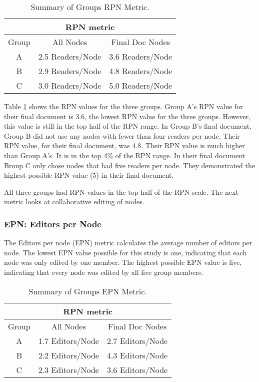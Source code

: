 \small
\begin{table}[htb]
  \caption{Summary of Groups RPN Metric.}
  \begin{center}
    \begin{tabular}{|c|c|c|}
      \hline
      \multicolumn{3}{|c|}{\rule[-3mm]{0mm}{8mm}\bf RPN metric}\\ \hline 
      Group&All Nodes&Final Doc Nodes\\ \hline 
      \hline
      A&2.5 Readers/Node&3.6 Readers/Node\\ \hline
      B&2.9 Readers/Node&4.8 Readers/Node\\ \hline
      C&3.0 Readers/Node&5.0 Readers/Node\\ \hline
    \end{tabular}
  \end{center}
  \label{tab:RPN}
\end{table}
\normalsize

Table \ref{tab:RPN} shows the RPN values for the three groups.  Group A's
RPN value for their final document is 3.6, the lowest RPN value for the
three groups.  However, this value is still in the top half of the RPN
range.  In Group B's final document, Group B did not use any nodes with
fewer than four readers per node.  Their RPN value, for their final
document, was 4.8.  Their RPN value is much higher than Group A's. It is in
the top 4\% of the RPN range.  In their final document Broup C only chose
nodes that had five readers per node.  They demonstrated the highest
possible RPN value (5) in their final document.

All three groups had RPN values in the top half of the RPN scale.
The next metric looks at collaborative editing of nodes. 

\subsubsection{EPN: Editors per Node}

The Editors per node (EPN) metric calculates the average number of editors
per node.  The lowest EPN value possible for this study is one, indicating
that each node was only edited by one member.  The highest possible EPN
value is five, indicating that every node was edited by all five group
members.

\small
\begin{table}[htb]
  \caption{Summary of Groups EPN Metric.}
  \begin{center}
    \begin{tabular}{|c|c|c|}
      \hline
      \multicolumn{3}{|c|}{\rule[-3mm]{0mm}{8mm}\bf RPN metric}\\ \hline 
      Group&All Nodes&Final Doc Nodes\\ \hline 
      \hline
      A&1.7 Editors/Node&2.7 Editors/Node\\ \hline
      B&2.2 Editors/Node&4.3 Editors/Node\\ \hline
      C&2.3 Editors/Node&3.6 Editors/Node\\ \hline
    \end{tabular}
  \end{center}
  \label{tab:EPN}
\end{table}
\normalsize


